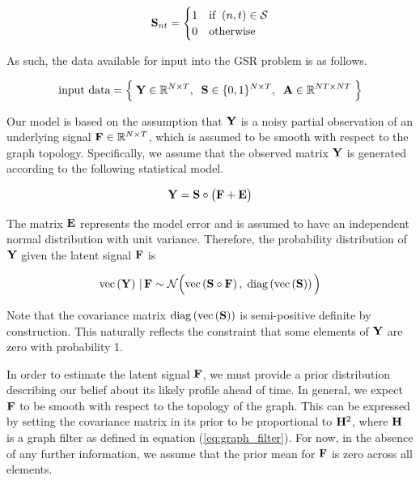 \begin{equation}
    \mathbf{S}_{nt} = \begin{cases}
        1 & \text{if} \;\; (n, t) \in \mathcal{S} \\
        0 & \text{otherwise}
    \end{cases}
\end{equation}

As such, the data available for input into the GSR problem is as follows. 

\begin{equation*}
    \text{input data} = \Big\{\; \mathbf{Y} \in \mathbb{R}^{N \times T}, \;\; \mathbf{S} \in \{0, 1\}^{N \times T} , \;\; \mathbf{A} \in \mathbb{R}^{NT \times NT} \; \Big\}
\end{equation*}

Our model is based on the assumption that $\mathbf{Y}$ is a noisy partial observation of an underlying signal $\mathbf{F} \in \mathbb{R}^{N \times T}$, which is assumed to be smooth with respect to the graph topology. Specifically, we assume that the observed matrix $\mathbf{Y}$ is generated according to the following statistical model. 

\begin{equation}
    \mathbf{Y} = \mathbf{S} \circ \big(\mathbf{F} + \mathbf{E} \big)
\end{equation}

The matrix $\mathbf{E}$ represents the model error and is assumed to have an independent normal distribution with unit variance. Therefore, the probability distribution of $\mathbf{Y}$ given the latent signal $\mathbf{F}$ is

\begin{equation}
    \label{eq:Y_given_F}
    \text{\textup{vec}}\left(\mathbf{Y}\right) \, | \, \mathbf{F} \sim \mathcal{N}\Big(\text{\textup{vec}}\left(\mathbf{S} \circ \mathbf{F}\right), \; \text{\textup{diag}}\left(\text{\textup{vec}}\left(\mathbf{S}\right)\right)\Big)
\end{equation}

Note that the covariance matrix $\text{\textup{diag}}\left(\text{\textup{vec}}\left(\mathbf{S}\right)\right)$ is semi-positive definite by construction. This naturally reflects the constraint that some elements of $\mathbf{Y}$ are zero with probability 1. 

In order to estimate the latent signal $\mathbf{F}$, we must provide a prior distribution describing our belief about its likely profile ahead of time. In general, we expect $\mathbf{F}$ to be smooth with respect to the topology of the graph. This can be expressed by setting the covariance matrix in its prior to be proportional to $\mathbf{H}^2$, where $\mathbf{H}$ is a graph filter as defined in equation (\ref{eq:graph_filter}). For now, in the absence of any further information, we assume that the prior mean for $\mathbf{F}$ is zero across all elements.

